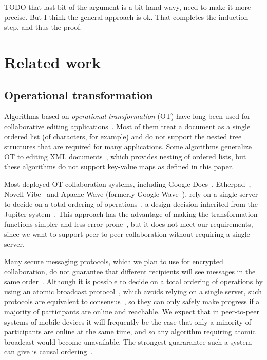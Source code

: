 \documentclass[10pt,journal,compsoc]{IEEEtran}
\begin{document}
TODO that last bit of the argument is a bit hand-wavy, need to make it more precise. But I think the general approach is ok. That completes the induction step, and thus the proof.

\fi %

\section{Related work}

\subsection{Operational transformation}\label{sec:related-ot}

Algorithms based on \emph{operational transformation} (OT) have long been used for collaborative editing applications~\cite{Ellis:1989ue,Ressel:1996wx,Sun:1998vf,Nichols:1995fd}. Most of them treat a document as a single ordered list (of characters, for example) and do not support the nested tree structures that are required for many applications. Some algorithms generalize OT to editing XML documents~\cite{Davis:2002iv,Ignat:2003jy,Wang:2015vo}, which provides nesting of ordered lists, but these algorithms do not support key-value maps as defined in this paper.

Most deployed OT collaboration systems, including Google Docs~\cite{DayRichter:2010tt}, Etherpad~\cite{Etherpad:2011um}, Novell Vibe~\cite{Spiewak:2010vw} and Apache Wave (formerly Google Wave~\cite{Wang:2015vo}), rely on a single server to decide on a total ordering of operations~\cite{Lemonik:2016wh}, a design decision inherited from the Jupiter system~\cite{Nichols:1995fd}. This approach has the advantage of making the transformation functions simpler and less error-prone~\cite{Imine:2003ks}, but it does not meet our requirements, since we want to support peer-to-peer collaboration without requiring a single server.

Many secure messaging protocols, which we plan to use for encrypted collaboration, do not guarantee that different recipients will see messages in the same order~\cite{Unger:2015kg}. Although it is possible to decide on a total ordering of operations by using an atomic broadcast protocol~\cite{Defago:2004ji}, which avoids relying on a single server, such protocols are equivalent to consensus~\cite{Chandra:1996cp}, so they can only safely make progress if a majority of participants are online and reachable. We expect that in peer-to-peer systems of mobile devices it will frequently be the case that only a minority of participants are online at the same time, and so any algorithm requiring atomic broadcast would become unavailable. The strongest guararantee such a system can give is causal ordering~\cite{Attiya:2015dm}.
\end{document}
